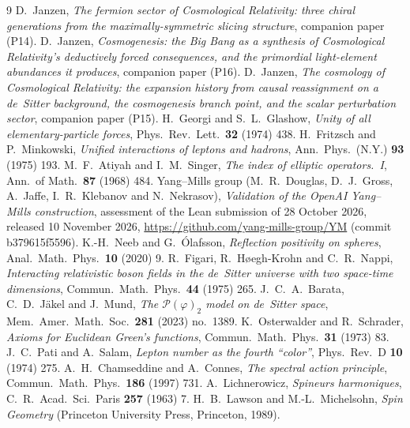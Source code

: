 \documentclass[11pt]{article}
\theoremstyle{plain}
\theoremstyle{remark}
\begin{document}
\begin{thebibliography}{9}
 D.~Janzen, \emph{The fermion sector of Cosmological Relativity: three chiral generations from the maximally-symmetric slicing structure}, companion paper (P14).
 D.~Janzen, \emph{Cosmogenesis: the Big Bang as a synthesis of Cosmological Relativity's deductively forced consequences, and the primordial light-element abundances it produces}, companion paper (P16).
 D.~Janzen, \emph{The cosmology of Cosmological Relativity: the expansion history from causal reassignment on a de~Sitter background, the cosmogenesis branch point, and the scalar perturbation sector}, companion paper (P15).
 H.~Georgi and S.~L.~Glashow, \emph{Unity of all elementary-particle forces}, Phys.\ Rev.\ Lett.\ \textbf{32} (1974) 438.
 H.~Fritzsch and P.~Minkowski, \emph{Unified interactions of leptons and hadrons}, Ann.\ Phys.\ (N.Y.) \textbf{93} (1975) 193.
 M.~F.~Atiyah and I.~M.~Singer, \emph{The index of elliptic operators.\ I}, Ann.\ of Math.\ \textbf{87} (1968) 484.
 Yang--Mills group (M.~R.~Douglas, D.~J.~Gross, A.~Jaffe, I.~R.~Klebanov and N.~Nekrasov), \emph{Validation of the OpenAI Yang--Mills construction}, assessment of the Lean submission of 28 October 2026, released 10 November 2026, \url{https://github.com/yang-mills-group/YM} (commit b379615f5596).
 K.-H.~Neeb and G.~\'Olafsson, \emph{Reflection positivity on spheres}, Anal.\ Math.\ Phys.\ \textbf{10} (2020) 9.
 R.~Figari, R.~H\o egh-Krohn and C.~R.~Nappi, \emph{Interacting relativistic boson fields in the de~Sitter universe with two space-time dimensions}, Commun.\ Math.\ Phys.\ \textbf{44} (1975) 265.
 J.~C.~A.~Barata, C.~D.~J\"akel and J.~Mund, \emph{The $\mathscr{P}(\varphi)_2$ model on de~Sitter space}, Mem.\ Amer.\ Math.\ Soc.\ \textbf{281} (2023) no.~1389.
 K.~Osterwalder and R.~Schrader, \emph{Axioms for Euclidean Green's functions}, Commun.\ Math.\ Phys.\ \textbf{31} (1973) 83.
 J.~C.~Pati and A.~Salam, \emph{Lepton number as the fourth ``color''}, Phys.\ Rev.\ D \textbf{10} (1974) 275.
 A.~H.~Chamseddine and A.~Connes, \emph{The spectral action principle}, Commun.\ Math.\ Phys.\ \textbf{186} (1997) 731.
 A.~Lichnerowicz, \emph{Spineurs harmoniques}, C.\ R.\ Acad.\ Sci.\ Paris \textbf{257} (1963) 7.
 H.~B.~Lawson and M.-L.~Michelsohn, \emph{Spin Geometry} (Princeton University Press, Princeton, 1989).
\end{thebibliography}



\end{document}
